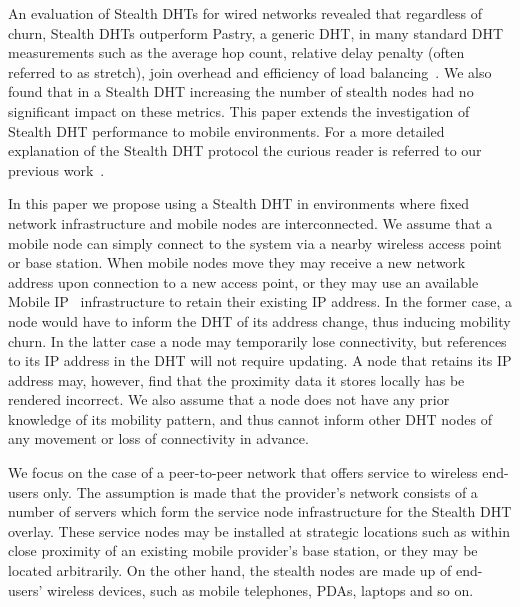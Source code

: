 \documentclass[times, 10pt,twocolumn]{article}
\begin{document}
An evaluation of Stealth DHTs for wired networks revealed that
regardless of churn, Stealth DHTs outperform Pastry, a generic DHT,
in many standard DHT measurements such as the average hop count,
relative delay penalty (often referred to as stretch), join overhead
and efficiency of load balancing~\cite{stealth1}. We also found that
in a Stealth DHT increasing the number of stealth nodes had no
significant impact on these metrics. This paper extends the
investigation of Stealth DHT performance to mobile environments. For
a more detailed explanation of the Stealth DHT protocol the curious
reader is referred to our previous work~\cite{stealth1}. %

 \label{sect-mobile}

In this paper we propose using a Stealth DHT in environments where
fixed network infrastructure and mobile nodes are interconnected. We
assume that a mobile node can simply connect to the system via a
nearby wireless access point or base station. When mobile nodes move
they may receive a new network address upon connection to a new
access point, or they may use an available Mobile IP~\cite{rfc3344}
infrastructure to retain their existing IP address. In the former
case, a node would have to inform the DHT of its address change,
thus inducing mobility churn. In the latter case a node may
temporarily lose connectivity, but references to its IP address in
the DHT will not require updating. A node that retains its IP
address may, however, find that the proximity data it stores locally
has be rendered incorrect. We also assume that a node does not have
any prior knowledge of its mobility pattern, and thus cannot inform
other DHT nodes of any movement or loss of connectivity in advance.

We focus on the case of a peer-to-peer network that offers service
to wireless end-users only. The assumption is made that the
provider's network consists of a number of servers which form the
service node infrastructure for the Stealth DHT overlay. These
service nodes may be installed at strategic locations such as within
close proximity of an existing mobile provider's base station, or
they may be located arbitrarily. On the other hand, the stealth
nodes are made up of end-users' wireless devices, such as mobile
telephones, PDAs, laptops and so on.

\end{document}
